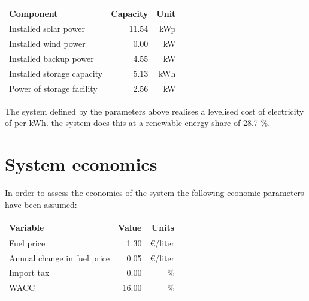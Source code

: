 \documentclass{article}
\begin{document}
\begin{multicols*}{2}
\begin{center}

\begin{tabular}{|l|r|r|}

\hline Component&Capacity&Unit\\ \hline 

Installed solar power&11.54&kWp\\ 

Installed wind power&0.00&kW\\ 

Installed backup power&4.55&kW\\ 

Installed storage capacity&5.13&kWh\\ 

Power of storage facility&2.56&kW\\ 

\hline

\end{tabular}

\label{tab:systemlayout}

\end{center}\vspace{0.5mm}

The system defined by the parameters above realises a levelised cost of electricity of  per kWh. the system does this at a renewable energy share of 28.7 \%. 

\section*{System economics}

In order to assess the economics of the system the following economic parameters have been assumed: 

\begin{center}

\begin{tabular}{|l|r|r|}

\hline Variable&Value&Units\\ \hline 

Fuel price&1.30&\euro /liter\\ 

Annual change in fuel price&0.05&\euro /liter\\ 

Import tax&0.00&\%\\ 

WACC&16.00&\%\\ 


\end{tabular}
\end{center}
\end{multicols*}
\end{document}
